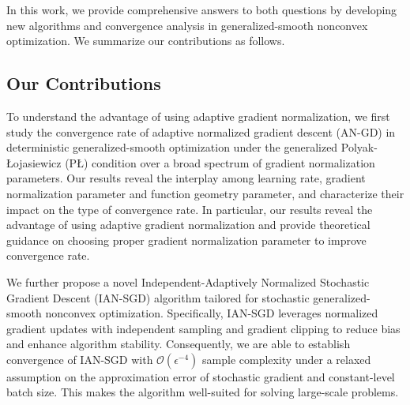 \documentclass[10pt]{article} %
\begin{document}
In this work, we provide comprehensive answers to both questions by developing new algorithms and convergence analysis in generalized-smooth nonconvex optimization.
We summarize our contributions as follows.
\subsection{Our Contributions}
    To understand the advantage of using adaptive gradient normalization, we first study the convergence rate of adaptive normalized gradient descent (AN-GD) in deterministic generalized-smooth optimization under the generalized Polyak-{\L}ojasiewicz (P{\L}) condition over a broad spectrum of gradient normalization parameters. Our results reveal the interplay among learning rate, gradient normalization parameter and function geometry parameter, and characterize their impact on the type of convergence rate.
    In particular, our results reveal the advantage of using adaptive gradient normalization and provide theoretical guidance on choosing proper gradient normalization parameter to improve convergence rate.
    
    
    We further propose a novel Independent-Adaptively Normalized Stochastic Gradient Descent (IAN-SGD) algorithm tailored for stochastic generalized-smooth nonconvex optimization. Specifically, IAN-SGD leverages normalized gradient updates with independent sampling and gradient clipping to reduce bias and enhance algorithm stability. Consequently, we are able to establish convergence of IAN-SGD with $\mathcal{O}(\epsilon^{-4})$ sample complexity under a relaxed assumption on the approximation error of stochastic gradient and constant-level batch size. This makes the algorithm well-suited for solving large-scale problems.
    
\end{document}
